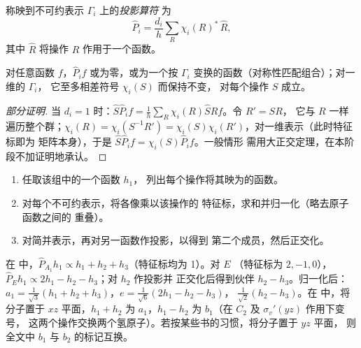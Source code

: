 \begin{definition}[投影算符]\label{def:b3:group-theory-applied:projection}
称映到不可约表示 $\Gamma_i$ 上的\emph{投影算符}
为
\[
\hat P_i = \frac{d_i}{h}\sum_R\chi_i(R)^*\,\hat R,
\]
其中 $\hat R$ 将操作 $R$ 作用于一个函数。
\end{definition}

\begin{proposition}[投影算符的作用]\label{prop:b3:group-theory-applied:projection}
对任意函数 $f$，$\hat P_if$ 或为零，或为一个按
$\Gamma_i$ 变换的函数（对称性匹配组合）；对一维的 $\Gamma_i$，
它至多相差符号 $\chi_i(S)$ 而保持不变，
对每个操作 $S$ 成立。
\end{proposition}

\begin{proof}[部分证明]
当 $d_i = 1$ 时：$\hat S\hat P_if = \frac1h\sum_R\chi_i(R)\hat S\hat Rf$。令 $R' = SR$，
它与 $R$ 一样遍历整个群；$\chi_i(R) = \chi_i(S^{-1}R') =
\chi_i(S)\chi_i(R')$，对一维表示（此时特征标即为
矩阵本身），于是 $\hat S\hat P_if = \chi_i(S)\hat P_if$。一般情形
需用大正交定理，在本阶段不加证明地承认。
\end{proof}

\begin{method}[构造对称性匹配组合]\label{met:b3:group-theory-applied:salc}
\begin{enumerate}
  \item 任取该组中的一个函数 $h_1$，
        列出每个操作将其映为的函数。
  \item 对每个不可约表示，将各像乘以该操作的
        特征标，求和并归一化（略去原子函数之间的
        重叠）。
  \item 对简并表示，再对另一函数作投影，以得到
        第二个成员，然后正交化。
\end{enumerate}
\end{method}

\begin{example}[氨与水的组合]\label{ex:b3:group-theory-applied:salcs}
在  中，$\hat P_{A_1}h_1 \propto h_1 + h_2 + h_3$（特征标均为 1）。对 $E$
（特征标为 $2, -1, 0$），$\hat P_Eh_1 \propto 2h_1 - h_2 - h_3$；对 $h_2$ 作投影并
正交化后得到伙伴 $h_2 - h_3$。归一化后：$a_1 =
\frac{1}{\sqrt3}(h_1 + h_2 + h_3)$，$e = \frac{1}{\sqrt6}(2h_1 - h_2 - h_3)$，
$\frac{1}{\sqrt2}(h_2 - h_3)$。在  中，将分子置于 $xz$ 平面，$h_1 + h_2$ 为
$a_1$，$h_1 - h_2$ 为 $b_1$（在 $C_2$ 及 $\sigma_v'(yz)$ 作用下变号，
这两个操作交换两个氢原子）。若按某些书的习惯，将分子置于 $yz$ 平面，
则全文中 $b_1$ 与 $b_2$ 的标记互换。
\end{example}

